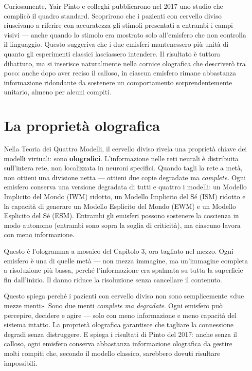 \documentclass[11pt, twoside, openright]{book}
\begin{document}
Curiosamente, Yair Pinto e colleghi pubblicarono nel 2017 uno studio che complicò il quadro standard. Scoprirono che i pazienti con cervello diviso riuscivano a riferire con accuratezza gli stimoli presentati a entrambi i campi visivi --- anche quando lo stimolo era mostrato solo all'emisfero che non controlla il linguaggio. Questo suggeriva che i due emisferi mantenessero più unità di quanto gli esperimenti classici lasciassero intendere. Il risultato è tuttora dibattuto, ma si inserisce naturalmente nella cornice olografica che descriverò tra poco: anche dopo aver reciso il calloso, in ciascun emisfero rimane abbastanza informazione ridondante da sostenere un comportamento sorprendentemente unitario, almeno per alcuni compiti.

\section*{La proprietà olografica}

Nella Teoria dei Quattro Modelli, il cervello diviso rivela una proprietà chiave dei modelli virtuali: sono \textbf{olografici}. L'informazione nelle reti neurali è distribuita sull'intera rete, non localizzata in neuroni specifici. Quando tagli la rete a metà, non ottieni una divisione netta --- ottieni due copie degradate ma \textit{complete}. Ogni emisfero conserva una versione degradata di tutti e quattro i modelli: un Modello Implicito del Mondo (IWM) ridotto, un Modello Implicito del Sé (ISM) ridotto e la capacità di generare un Modello Esplicito del Mondo (EWM) e un Modello Esplicito del Sé (ESM). Entrambi gli emisferi possono sostenere la coscienza in modo autonomo (entrambi sono sopra la soglia di criticità), ma ciascuno lavora con meno informazione.

Questo è l'ologramma a mosaico del Capitolo 3, ora tagliato nel mezzo. Ogni emisfero è una di quelle metà --- non mezza immagine, ma un'immagine completa a risoluzione più bassa, perché l'informazione era spalmata su tutta la superficie fin dall'inizio. Il danno riduce la risoluzione senza cancellare il contenuto.

Questo spiega perché i pazienti con cervello diviso non sono semplicemente «due mezze menti». Sono due menti \textit{complete ma degradate}. Ogni emisfero può percepire, decidere e agire --- solo con meno informazione e meno capacità del sistema intatto. La proprietà olografica garantisce che tagliare la connessione degradi senza distruggere. E spiega i risultati di Pinto del 2017: anche senza il calloso, ogni emisfero conserva abbastanza informazione olografica da gestire molti compiti che, secondo il modello classico, sarebbero dovuti risultare impossibili.
\end{document}
